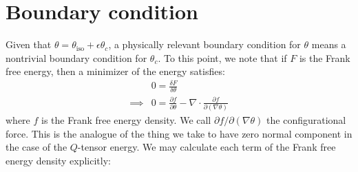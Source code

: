 \documentclass[reqno]{article}
\begin{document}
\section{Boundary condition}
Given that $\theta = \theta_\text{iso} + \epsilon \theta_c$, a physically relevant boundary condition for $\theta$ means a nontrivial boundary condition for $\theta_c$.
To this point, we note that if $F$ is the Frank free energy, then a minimizer of the energy satisfies:
\begin{equation}
\begin{split}
    &0 = \frac{\delta F}{\delta \theta} \\
    \implies
    &0 = \frac{\partial f}{\partial \theta} - \nabla \cdot \frac{\partial f}{\partial (\nabla \theta)}
\end{split}
\end{equation}
where $f$ is the Frank free energy density.
We call $\partial f / \partial (\nabla \theta)$ the configurational force.
This is the analogue of the thing we take to have zero normal component in the case of the $Q$-tensor energy.
We may calculate each term of the Frank free energy density explicitly:
\end{document}

